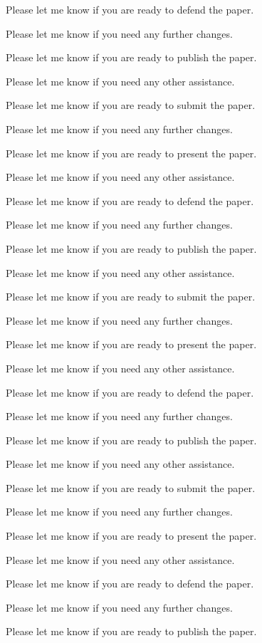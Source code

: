 Please let me know if you are ready to defend the paper. 

Please let me know if you need any further changes. 

Please let me know if you are ready to publish the paper. 

Please let me know if you need any other assistance. 

Please let me know if you are ready to submit the paper. 

Please let me know if you need any further changes. 

Please let me know if you are ready to present the paper. 

Please let me know if you need any other assistance. 

Please let me know if you are ready to defend the paper. 

Please let me know if you need any further changes. 

Please let me know if you are ready to publish the paper. 

Please let me know if you need any other assistance. 

Please let me know if you are ready to submit the paper. 

Please let me know if you need any further changes. 

Please let me know if you are ready to present the paper. 

Please let me know if you need any other assistance. 

Please let me know if you are ready to defend the paper. 

Please let me know if you need any further changes. 

Please let me know if you are ready to publish the paper. 

Please let me know if you need any other assistance. 

Please let me know if you are ready to submit the paper. 

Please let me know if you need any further changes. 

Please let me know if you are ready to present the paper. 

Please let me know if you need any other assistance. 

Please let me know if you are ready to defend the paper. 

Please let me know if you need any further changes. 

Please let me know if you are ready to publish the paper. 

